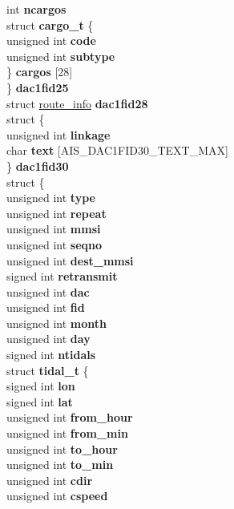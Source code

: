 \begin{DoxyCompactItemize}
{\begin{tabbing}
{\>\>\>\>int {\bfseries ncargos}\\
\>\>\>\>struct {\bfseries cargo\_t} \{\\
\>\>\>\>\>unsigned int {\bfseries code}\\
\>\>\>\>\>unsigned int {\bfseries subtype}\\
\>\>\>\>\} {\bfseries cargos} \mbox{[}28\mbox{]}\\
\>\>\>\} {\bfseries dac1fid25}\\
\>\>\>struct \hyperlink{structroute__info}{route\_info} {\bfseries dac1fid28}\\
\>\>\>struct \{\\
\>\>\>\>unsigned int {\bfseries linkage}\\
\>\>\>\>char {\bfseries text} \mbox{[}AIS\_DAC1FID30\_TEXT\_MAX\mbox{]}\\
\>\>\>\} {\bfseries dac1fid30}\\
\>\>\>struct \{\\
\>\>\>\>unsigned int {\bfseries type}\\
\>\>\>\>unsigned int {\bfseries repeat}\\
\>\>\>\>unsigned int {\bfseries mmsi}\\
\>\>\>\>unsigned int {\bfseries seqno}\\
\>\>\>\>unsigned int {\bfseries dest\_mmsi}\\
\>\>\>\>signed int {\bfseries retransmit}\\
\>\>\>\>unsigned int {\bfseries dac}\\
\>\>\>\>unsigned int {\bfseries fid}\\
\>\>\>\>unsigned int {\bfseries month}\\
\>\>\>\>unsigned int {\bfseries day}\\
\>\>\>\>signed int {\bfseries ntidals}\\
\>\>\>\>struct {\bfseries tidal\_t} \{\\
\>\>\>\>\>signed int {\bfseries lon}\\
\>\>\>\>\>signed int {\bfseries lat}\\
\>\>\>\>\>unsigned int {\bfseries from\_hour}\\
\>\>\>\>\>unsigned int {\bfseries from\_min}\\
\>\>\>\>\>unsigned int {\bfseries to\_hour}\\
\>\>\>\>\>unsigned int {\bfseries to\_min}\\
\>\>\>\>\>unsigned int {\bfseries cdir}\\
\>\>\>\>\>unsigned int {\bfseries cspeed}\\
}
\end{tabbing}}
\end{DoxyCompactItemize}
